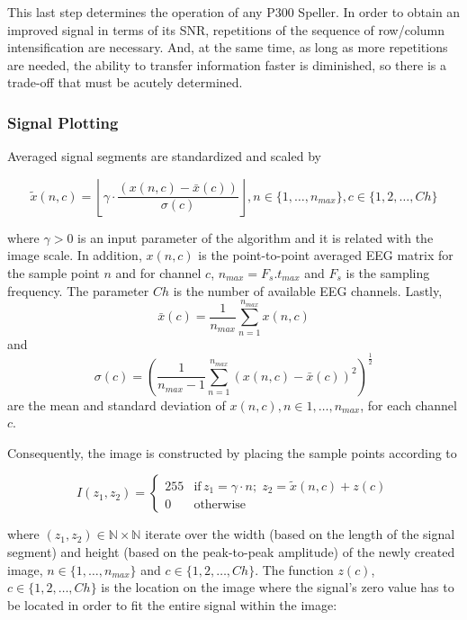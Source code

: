 \documentclass[entropy,article,submit,moreauthors,pdftex,10pt,a4paper]{mdpi}
\begin{document}
This last step determines the operation of any P300 Speller.  In order to obtain an improved signal in terms of its SNR, repetitions of the sequence of row/column intensification are necessary.  And, at the same time, as long as more repetitions are needed, the ability to transfer information faster is diminished, so there is a trade-off that must be acutely determined.

\subsubsection{Signal Plotting} \label{Plot}

Averaged signal segments are standardized and scaled by 

\begin{equation}
\tilde{x}(n,c) = \left \lfloor{ \gamma \cdot \frac{( x(n,c) - \bar{x}(c)  )}{ \sigma(c) } }\right \rfloor, n \in \{ 1, \dots, n_{max}\},c \in \{1,2,\dots,Ch\}
\label{eq:standarizedaverages}
\end{equation}

\noindent where $\gamma > 0$ is an input parameter of the algorithm and  it is related with the image scale. In addition, $ x(n,c) $ is the point-to-point averaged EEG matrix for the sample point $n$ and for channel $c$, $n_{max}=F_s.t_{max}$ and $F_s$ is the sampling frequency. The parameter  $Ch$ is the number of available EEG channels. Lastly, $$\bar{x}(c) =\frac{1}{n_{max}}\sum_{n=1}^{n_{max}}x(n,c)$$ and $$ \sigma(c) = (\frac{1}{n_{max}-1}\sum_{n=1}^{n_{max}}(x(n,c)-\bar{x}(c))^2 )^{\frac{1}{2}}$$ are the mean and standard deviation of $x(n,c), n \in 1,\dots,n_{max}$, for each channel $c$.

Consequently, the image is constructed by placing the sample points according to

\begin{equation}
I(z_1,z_2) = \left\{ \begin{array}{rl}
255 & \text{if} \,  z_1 = \gamma \cdot n; \; z_2 = \tilde{x}(n,c) + z(c) \\
0   & \mbox{otherwise}
\end{array}\right.
\label{eq:images}
\end{equation}

\noindent where $ (z_1,z_2) \in \mathbb{N} \times \mathbb{N}$ iterate over the width (based on the length of the signal segment) and height (based on the peak-to-peak amplitude) of the newly created image,  $n \in \{1, \dots, n_{max}\}$ and $c \in \{1,2,\dots,Ch\}$.  The function $z(c)$, $c \in \{1,2,\dots,Ch\}$ is the location on the image where the signal's zero value has to be located in order to fit the entire signal within the image:
\end{document}
